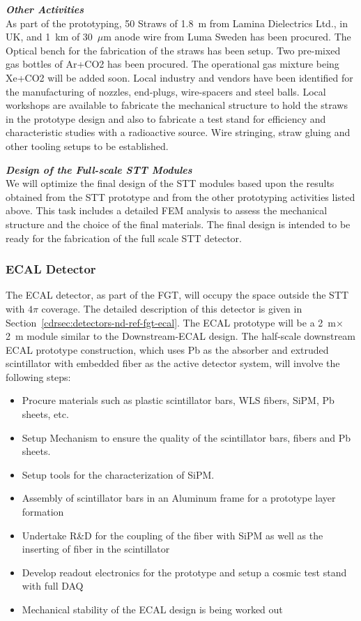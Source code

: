 \textbf{ \textit{Other Activities}} \\
As part of the prototyping, 50 Straws of 1.8~m from Lamina
Dielectrics Ltd., in UK, and 1~km of 30~$\mu$m anode wire from Luma
Sweden has been procured. The Optical bench for the fabrication of the
straws has been setup.  Two pre-mixed gas bottles of Ar+CO2 has been
procured. The operational gas mixture being Xe+CO2 will be added
soon. Local industry and vendors have been identified for the
manufacturing of nozzles, end-plugs, wire-spacers and steel
balls. Local workshops are available to fabricate the mechanical
structure to hold the straws in the prototype design and also to
fabricate a test stand for efficiency and characteristic studies with
a radioactive source. Wire stringing, straw gluing and other tooling
setups to be established.


\textbf{ \textit{Design of the Full-scale STT Modules}} \\
We will optimize the final design of the STT modules based upon the
results obtained from the STT prototype and from the other prototyping
activities listed above. This task includes a detailed FEM analysis to
assess the mechanical structure and the choice of the final
materials. The final design is intended to be ready for the
fabrication of the full scale STT detector.



\subsubsection{ECAL Detector}

The ECAL detector, as part of the FGT, will occupy the space outside
the STT with $4\pi$ coverage.  The detailed description of this
detector is given in Section~\ref{cdrsec:detectors-nd-ref-fgt-ecal}.
The ECAL prototype will be a 2~m$\times$2~m module similar to the
Downstream-ECAL design.  The half-scale downstream ECAL prototype
construction, which uses Pb as the absorber and extruded scintillator
with embedded fiber as the active detector system, will involve the
following steps:
\begin{itemize}
\item Procure materials such as plastic scintillator bars, WLS fibers,
  SiPM, Pb sheets, etc.
\item Setup Mechanism to ensure the quality of the scintillator bars,
  fibers and Pb sheets.
\item Setup tools for the characterization of SiPM.
\item Assembly of scintillator bars in an Aluminum frame for a
  prototype layer formation
\item Undertake R\&D for the coupling of the fiber with SiPM as well
  as the inserting of fiber in the scintillator
\item Develop readout electronics for the prototype and setup a cosmic
  test stand with full DAQ
\item Mechanical stability of the ECAL design is being worked out
\end{itemize}

